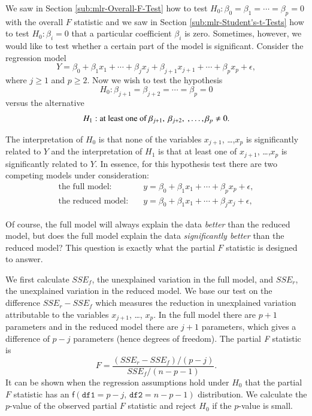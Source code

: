 \documentclass[captions=tableheading]{scrbook}
\begin{document}
\label{sec:Partial-F-Statistic}

We saw in Section \ref{sub:mlr-Overall-F-Test} how to test $H_{0}:\beta_{0}=\beta_{1}=\cdots=\beta_{p}=0$ with the overall $F$ statistic and we saw in Section \ref{sub:mlr-Student's-t-Tests} how to test $H_{0}:\beta_{i}=0$ that a particular coefficient $\beta_{i}$ is zero. Sometimes, however, we would like to test whether a certain part of the model is significant. Consider the regression model
\begin{equation}
Y=\beta_{0}+\beta_{1}x_{1}+\cdots+\beta_{j}x_{j}+\beta_{j+1}x_{j+1}+\cdots+\beta_{p}x_{p}+\epsilon,
\end{equation}
where $j\geq1$ and $p\geq2$. Now we wish to test the hypothesis
\begin{equation}
H_{0}:\beta_{j+1}=\beta_{j+2}=\cdots=\beta_{p}=0
\end{equation}
versus the alternative 
\begin{equation}
H_{1}:\mbox{at least one of \ensuremath{\beta_{j+1},\ \beta_{j+2},\ ,\ldots,\beta_{p}\neq0}}.
\end{equation}

The interpretation of $H_{0}$ is that none of the variables $x_{j+1}$, \ldots{},$x_{p}$ is significantly related to $Y$ and the interpretation of $H_{1}$ is that at least one of $x_{j+1}$, \ldots{},$x_{p}$ is significantly related to $Y$. In essence, for this hypothesis test there are two competing models under consideration:
\begin{align}
\mbox{the full model:} & \quad y=\beta_{0}+\beta_{1}x_{1}+\cdots+\beta_{p}x_{p}+\epsilon,\\
\mbox{the reduced model:} & \quad y=\beta_{0}+\beta_{1}x_{1}+\cdots+\beta_{j}x_{j}+\epsilon,
\end{align}

Of course, the full model will always explain the data \emph{better} than the reduced model, but does the full model explain the data \emph{significantly better} than the reduced model? This question is exactly what the partial $F$ statistic is designed to answer.

We first calculate $SSE_{f}$, the unexplained variation in the full model, and $SSE_{r}$, the unexplained variation in the reduced model. We base our test on the difference $SSE_{r}-SSE_{f}$ which measures the reduction in unexplained variation attributable to the variables $x_{j+1}$, \ldots{}, $x_{p}$. In the full model there are $p+1$ parameters and in the reduced model there are $j+1$ parameters, which gives a difference of $p-j$ parameters (hence degrees of freedom). The partial \emph{F} statistic is 
\begin{equation}
F=\frac{(SSE_{r}-SSE_{f})/(p-j)}{SSE_{f}/(n-p-1)}.
\end{equation}
It can be shown when the regression assumptions hold under $H_{0}$ that the partial $F$ statistic has an $\mathsf{f}(\mathtt{df1}=p-j,\,\mathtt{df2}=n-p-1)$ distribution. We calculate the $p$-value of the observed partial $F$ statistic and reject $H_{0}$ if the $p$-value is small. 
\end{document}
